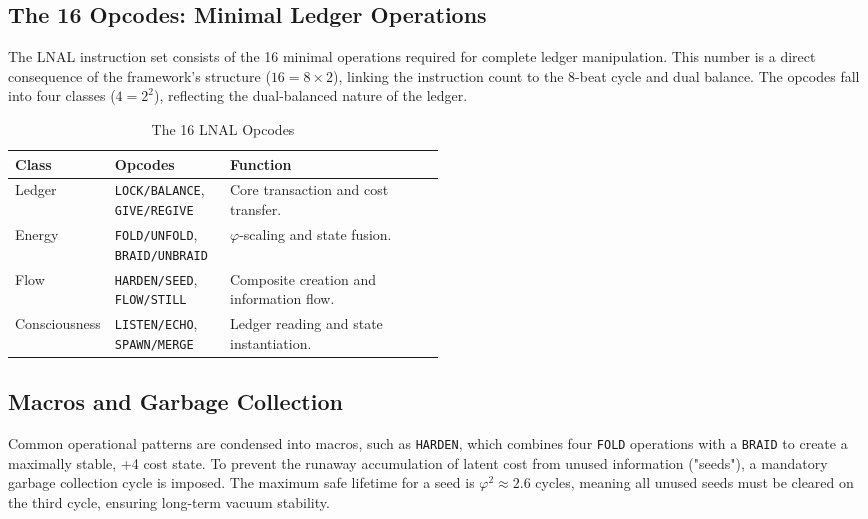 \subsection{The 16 Opcodes: Minimal Ledger Operations}
The LNAL instruction set consists of the 16 minimal operations required for complete ledger manipulation. This number is a direct consequence of the framework's structure (\(16 = 8 \times 2\)), linking the instruction count to the 8-beat cycle and dual balance. The opcodes fall into four classes (\(4=2^2\)), reflecting the dual-balanced nature of the ledger.

\begin{table}[h!]
\centering
\caption{The 16 LNAL Opcodes}
\label{tab:opcodes}
\begin{tabular}{llp{0.5\linewidth}}
\toprule
\textbf{Class} & \textbf{Opcodes} & \textbf{Function} \\
\midrule
Ledger & \texttt{LOCK/BALANCE}, \texttt{GIVE/REGIVE} & Core transaction and cost transfer. \\
Energy & \texttt{FOLD/UNFOLD}, \texttt{BRAID/UNBRAID} & \(\varphi\)-scaling and state fusion. \\
Flow & \texttt{HARDEN/SEED}, \texttt{FLOW/STILL} & Composite creation and information flow. \\
Consciousness & \texttt{LISTEN/ECHO}, \texttt{SPAWN/MERGE} & Ledger reading and state instantiation. \\
\bottomrule
\end{tabular}
\end{table}

\subsection{Macros and Garbage Collection}
Common operational patterns are condensed into macros, such as \texttt{HARDEN}, which combines four \texttt{FOLD} operations with a \texttt{BRAID} to create a maximally stable, +4 cost state. To prevent the runaway accumulation of latent cost from unused information ("seeds"), a mandatory garbage collection cycle is imposed. The maximum safe lifetime for a seed is \(\varphi^2 \approx 2.6\) cycles, meaning all unused seeds must be cleared on the third cycle, ensuring long-term vacuum stability.

